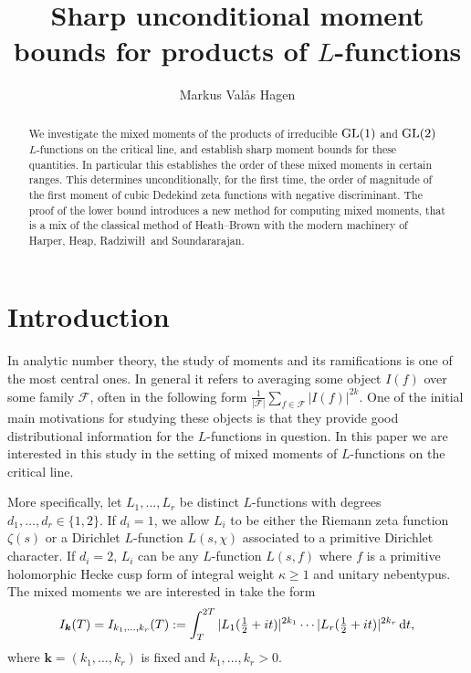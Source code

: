 \documentclass[oneside, 12pt]{amsart}
\author[M.~V.~Hagen]{Markus Valås Hagen}
\theoremstyle{definition}
\newcommand{\dt}{\, \textup{d}t}
\begin{document}
	
	\title{Sharp unconditional moment bounds for products of $L$-functions}
	
	\begin{abstract}
		We investigate the mixed moments of the products of irreducible $\textup{GL}(1)$ and $\textup{GL}(2)$ $L$-functions on the critical line, and establish sharp moment bounds for these quantities. In particular this establishes the order of these mixed moments in certain ranges. This determines unconditionally, for the first time, the order of magnitude of the first moment of cubic Dedekind zeta functions with negative discriminant.  The proof of the lower bound introduces a new method for computing mixed moments, that is a mix of the classical method of Heath--Brown with the modern machinery of Harper, Heap, Radziwi\l\l\, and Soundararajan. 
	\end{abstract}
	\maketitle
	
	\section{Introduction}
	In analytic number theory, the study of moments and its ramifications is one of the most central ones. In general it refers to averaging some object $I(f)$ over some family $\mathcal{F}$, often in the following form $\frac{1}{|\mathcal{F}|}\sum_{f \in \mathcal{F}} |I(f)|^{2k}$. One of the initial main motivations for studying these objects is that they provide good distributional information for the $L$-functions in question. In this paper we are interested in this study in the setting of mixed moments of $L$-functions on the critical line.
	
	More specifically, let $L_1,\dots,L_r$ be distinct $L$-functions with degrees $d_1,\dots,d_r \in \{1,2\}$. If $d_i = 1$, we allow $L_i$ to be either the Riemann zeta function $\zeta(s)$ or a Dirichlet $L$-function $L(s,\chi)$ associated to a primitive Dirichlet character. If $d_i=2$, $L_i$ can be any $L$-function $L(s,f)$ where $f$ is a primitive holomorphic Hecke cusp form of integral weight $\kappa \geq 1$ and unitary nebentypus. The mixed moments we are interested in take the form
	\begin{equation}\label{mixedMomentDefinition}
		I_{\boldsymbol k}(T)=I_{k_1,\ldots,k_r}(T)
		:=\int_T^{2T}|L_1(\tfrac12+it)|^{2k_1}\cdots |L_r(\tfrac12+it)|^{2k_r}\dt,
	\end{equation}
	where $\boldsymbol{k} = (k_1,\dots,k_r)$ is fixed and $k_1,\ldots,k_r>0$.
	
\end{document}

